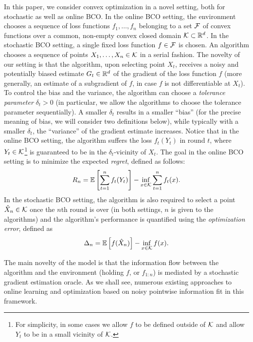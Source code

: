 In this paper, we consider convex optimization in a novel setting, both for stochastic as well as online BCO.
In the online BCO setting, the environment chooses a sequence of loss functions $f_1,\dots,f_n$ belonging to a set $\mathcal{F}$ of convex functions over a common, non-empty convex closed domain $\mathcal{K}\subset \mathbb{R}^d$.
In the stochastic BCO setting, a single fixed loss function $f\in \mathcal{F}$ is chosen.
An algorithm chooses a sequence of points $X_1,\dots,X_n\in \mathcal{K}$ in a serial fashion.
The novelty of our setting is that the algorithm, upon selecting point $X_t$, receives
a noisy and potentially biased estimate $G_t\in \mathbb{R}^d$
of the gradient of the loss function $f$
(more generally, an estimate of a subgradient of $f$, in case $f$ is not differentiable at $X_t$).
To control the bias and the variance, the algorithm can choose a \emph{tolerance parameter} $\delta_t>0$
(in particular, we allow the algorithms to choose the tolerance parameter sequentially).
A smaller $\delta_t$ results in a smaller ``bias'' (for the precise meaning of bias, we will consider two definitions below), while typically with a smaller $\delta_t$, the ``variance'' of the gradient estimate increases.
Notice that in the online BCO setting, the algorithm suffers the loss $f_t(Y_t)$ in round $t$, where $Y_t\in \mathcal{K}$\footnote{For simplicity, in some cases we allow $f$ to be defined outside of $\mathcal{K}$ and allow $Y_t$ to be in a small vicinity of $\mathcal{K}$.} is guaranteed to be in the $\delta_t$-vicinity of $X_t$.
The goal in the online BCO setting is to minimize the expected \emph{regret}, defined as follows:
	$$R_n =\mathbb{E}\left[ \sum_{t=1}^n f_t(Y_t)\right] - \inf_{x\in \mathcal{K}} \sum_{t=1}^n f_t(x).$$
In the stochastic BCO setting, the algorithm is also required to select a point $\hat{X}_n\in \mathcal{K}$ once
the $n$th round is over (in both settings, $n$ is given to the algorithms)
and the algorithm's performance is quantified using the \emph{optimization error}, defined as
$$\Delta_n = \mathbb{E}\left[f(\hat{X}_n)\right] - \inf_{x\in \mathcal{K}} f(x).$$

The main novelty of the model is that the information flow between the algorithm and the environment (holding $f$, or $f_{1:n}$) is mediated by a stochastic gradient estimation oracle. As we shall see, numerous existing approaches to online learning and optimization based on noisy pointwise information fit in this framework.


